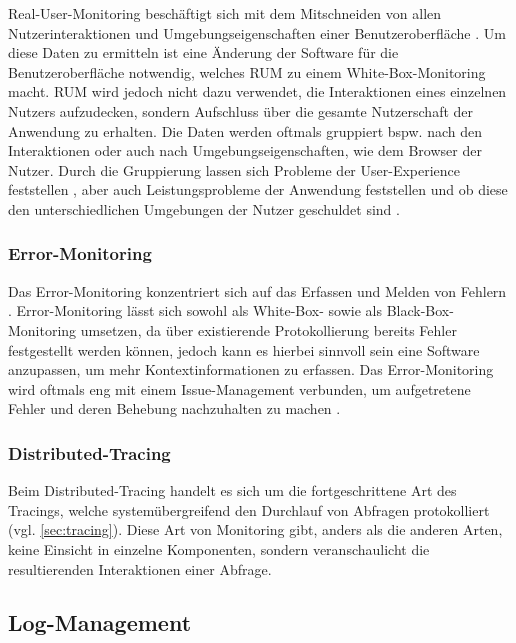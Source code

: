 Real-User-Monitoring beschäftigt sich mit dem Mitschneiden von allen Nutzerinteraktionen und Umgebungseigenschaften einer Benutzeroberfläche \cite{IdentifyingWebPerformanceDegradations}. Um diese Daten zu ermitteln ist eine Änderung der Software für die Benutzeroberfläche notwendig, welches RUM zu einem White-Box-Monitoring macht. RUM wird jedoch nicht dazu verwendet, die Interaktionen eines einzelnen Nutzers aufzudecken, sondern Aufschluss über die gesamte Nutzerschaft der Anwendung zu erhalten. Die Daten werden oftmals gruppiert bspw. nach den Interaktionen oder auch nach Umgebungseigenschaften, wie dem Browser der Nutzer. Durch die Gruppierung lassen sich Probleme der User-Experience feststellen \cite{AConceptLatticeForRecognitionOfUserProblems}, aber auch Leistungsprobleme der Anwendung feststellen und ob diese den unterschiedlichen Umgebungen der Nutzer geschuldet sind \cite{IdentifyingWebPerformanceDegradations}.

\subsubsection{Error-Monitoring}

Das Error-Monitoring konzentriert sich auf das Erfassen und Melden von Fehlern \cite{CrashbinCrashMonitoring}. Error-Monitoring lässt sich sowohl als White-Box- sowie als Black-Box-Monitoring umsetzen, da über existierende Protokollierung bereits Fehler festgestellt werden können, jedoch kann es hierbei sinnvoll sein eine Software anzupassen, um mehr Kontextinformationen zu erfassen. Das Error-Monitoring wird oftmals eng mit einem Issue-Management verbunden, um aufgetretene Fehler und deren Behebung nachzuhalten zu machen \cite{CrashbinCrashMonitoring}.

\subsubsection{Distributed-Tracing}

Beim Distributed-Tracing handelt es sich um die fortgeschrittene Art des Tracings, welche systemübergreifend den Durchlauf von Abfragen protokolliert (vgl. \autoref{sec:tracing}). Diese Art von Monitoring gibt, anders als die anderen Arten, keine Einsicht in einzelne Komponenten, sondern veranschaulicht die resultierenden Interaktionen einer Abfrage.

\subsection{Log-Management}


